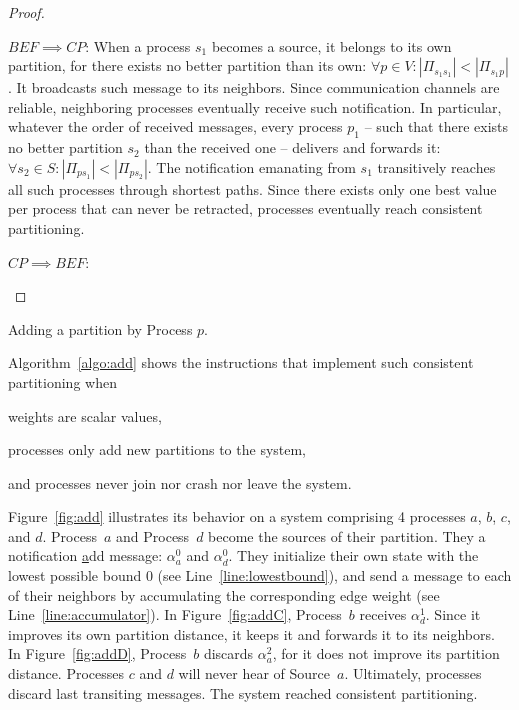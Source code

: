 \begin{proof}
  \begin{asparadesc}
  \item [$BEF \implies CP$:] When a process $s_1$ becomes a source, it
    belongs to its own partition, for there exists no better partition
    than its own: $\forall p \in V: |\Pi_{s_1 s_1}| < |\Pi_{s_1
      p}|$. It broadcasts such message to its neighbors. Since
    communication channels are reliable, neighboring processes
    eventually receive such notification. In particular, whatever the
    order of received messages, every process $p_1$ -- such that there
    exists no better partition $s_2$ than the received one -- delivers
    and forwards it: $\forall s_2 \in S: |\Pi_{p s_1}| < |\Pi_{p
      s_2}|$. The notification emanating from $s_1$ transitively
    reaches all such processes through shortest paths. Since there
    exists only one best value per process that can never be
    retracted, processes eventually reach consistent
    partitioning. 
  \item [$CP \implies BEF$:] 
  \end{asparadesc}
\end{proof}

\begin{algorithm}
  
  \caption{\label{algo:add}Adding a partition by Process $p$.}
\end{algorithm}

 

Algorithm~\ref{algo:add} shows the instructions that implement such
consistent partitioning when
\begin{inparaenum}[(i)]
\item weights are scalar values,
\item processes only add new partitions to the system,
\item and processes never join nor crash nor leave the system.
\end{inparaenum}
Figure~\ref{fig:add} illustrates its behavior on a system comprising 4
processes $a$, $b$, $c$, and $d$. Process~$a$ and Process~$d$ become
the sources of their partition. They \NAMEB a notification
\underline{a}dd message: $\alpha_a^0$ and $\alpha_d^0$. They
initialize their own state with the lowest possible bound $0$ (see
Line~\ref{line:lowestbound}), and send a message to each of their
neighbors by accumulating the corresponding edge weight (see
Line~\ref{line:accumulator}). In Figure~\ref{fig:addC}, Process~$b$
receives $\alpha_{d}^{1}$. Since it improves its own partition
distance, it keeps it and forwards it to its neighbors. In
Figure~\ref{fig:addD}, Process~$b$ discards $\alpha_{a}^{2}$, for it
does not improve its partition distance. Processes $c$ and $d$ will
never hear of Source~$a$. Ultimately, processes discard last
transiting messages. The system reached consistent partitioning.

